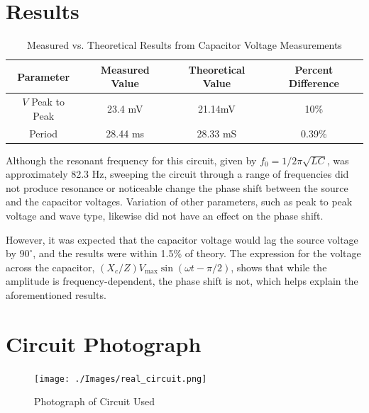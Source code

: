 \documentclass[twocolumn,english]{IEEEtran}
\theoremstyle{plain}
\theoremstyle{plain}
\begin{document}
\section{Results}
\begin{table}[h!]
\centering{}
\caption{Measured vs. Theoretical Results from Capacitor Voltage Measurements}
\label{tb:meas_err}
\begin{tabular}{|c|c|c|c|}
\hline
\textbf{Parameter}	&\textbf{Measured Value}		&\textbf{Theoretical Value}	&\textbf{Percent Difference}	\\ \hline
$V$ Peak to Peak	&23.4 mV				&21.14mV 			&10\%				\\ \hline
Period			&28.44 ms				&28.33 mS  			&0.39\% 			\\ \hline
\end{tabular}
\end{table}

Although the resonant frequency for this circuit, given by $f_0 = 1/2\pi\sqrt{LC}$, was approximately 82.3 Hz, sweeping the circuit through a range of frequencies did not produce resonance or noticeable change the phase shift between the source and the capacitor voltages. Variation of other parameters, such as peak to peak voltage and wave type, likewise did not have an effect on the phase shift.

However, it was expected that the capacitor voltage would lag the source voltage by $90^{\circ}$, and the results were within 1.5\% of theory. The expression for the voltage across the capacitor, $(X_c/Z)V_{\text{max}}\sin(\omega t- \pi/2)$, shows that while the amplitude is frequency-dependent, the phase shift is not, which helps explain the aforementioned results.

\appendices{}

\section{Circuit Photograph}\label{append:deriv}

\begin{figure}[h!]
  \begin{centering}
  \begin{center}
  \texttt{[image: ./Images/real\_circuit.png]}
  \label{fig:real_circuit}
  \caption{Photograph of Circuit Used}
  \end{center}
  \par\end{centering}
  \end{figure}

%
%
\end{document}
